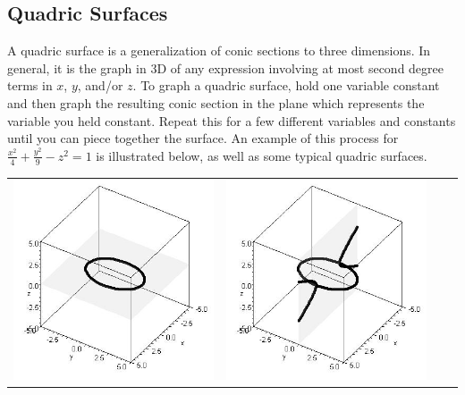 \subsection{Quadric Surfaces}
A quadric surface is a generalization of conic sections to three
dimensions.  In general, it is the graph in 3D of any expression
involving at most second degree terms in $x$, $y$, and/or $z$. To
graph a quadric surface, hold one variable constant and then graph the
resulting conic section in the plane which represents the variable you
held constant. Repeat this for a few different variables and constants
until you can piece together the surface.  An example of this process
for $\frac{x^2}{4}+\frac{y^2}{9}-z^2 =1$ is illustrated below, as well
as some typical quadric surfaces.  \renewcommand{\mywidth}{.9in}
\begin{center}
\begin{tabular}{cccc}
\includegraphics[width=\mywidth]{functions/quadric-1}&
\includegraphics[width=\mywidth]{functions/quadric-2}&

\end{tabular}
\end{center}
